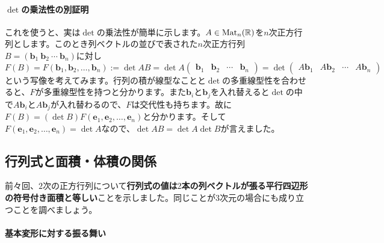 \paragraph{$\det$の乗法性の別証明} これを使うと、実は$\det$の乗法性が簡単に示します。$A\in \operatorname{Mat}_n(\mathbb{R})$を$n$次正方行列とします。このとき列ベクトルの並びで表された$n$次正方行列$B = (\bm{b}_1 \ \bm{b}_2 \ \cdots \ \bm{b}_n)$に対し
\[
F(B) = F(\bm{b}_1, \bm{b}_2, \ldots, \bm{b}_n) :=
\det AB = \det A \begin{pmatrix} \bm{b}_1 & \bm{b}_2 & \cdots & \bm{b}_n \end{pmatrix}
= \det \begin{pmatrix} A\bm{b}_1 & A\bm{b}_2 & \cdots & A\bm{b}_n \end{pmatrix} 
\]
という写像を考えてみます。行列の積が線型なことと$\det$の多重線型性を合わせると、$F$が多重線型性を持つと分かります。また$\bm{b}_i$と$\bm{b}_j$を入れ替えると$\det$の中で$A\bm{b}_i$と$A\bm{b}_j$が入れ替わるので、$F$は交代性も持ちます。故に$F(B) = (\det B) F(\bm{e}_1, \bm{e}_2, \ldots, \bm{e}_n)$と分かります。そして$F(\bm{e}_1, \bm{e}_2, \ldots, \bm{e}_n) = \det A$なので、$\det AB = \det A \det B$が言えました。

\subsection{行列式と面積・体積の関係}

前々回、$2$次の正方行列について\textbf{行列式の値は$2$本の列ベクトルが張る平行四辺形の符号付き面積と等しい}ことを示しました。同じことが$3$次元の場合にも成り立つことを調べましょう。

\paragraph{基本変形に対する振る舞い}

